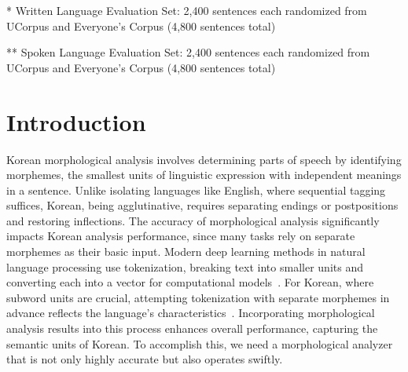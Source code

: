 \documentclass[AMS,STIX2COL]{WileyNJD-v2}
\begin{document}
\begin{table*}[ht]
\begin{tabular*}{500pt}{@{\extracolsep\fill}cccD{.}{.}{3}c@{\extracolsep\fill}}
            \bottomrule
        \end{tabular*}
        \begin{tablenotes}
            \footnotesize
            \item\hspace{2mm} * Written Language Evaluation Set: 2,400 sentences each randomized from UCorpus and Everyone's Corpus (4,800 sentences total)
            \item\hspace{2mm} ** Spoken Language Evaluation Set: 2,400 sentences each randomized from UCorpus and Everyone's Corpus (4,800 sentences total)
        \end{tablenotes}
    \end{table*}

    \section{Introduction}\label{sec:intro}

    Korean morphological analysis involves determining parts of speech by identifying morphemes, the smallest units of linguistic expression with independent meanings in a sentence.
    Unlike isolating languages like English, where sequential tagging suffices, Korean, being agglutinative, requires separating endings or postpositions and restoring inflections.
    The accuracy of morphological analysis significantly impacts Korean analysis performance, since many tasks rely on separate morphemes as their basic input.
    Modern deep learning methods in natural language processing use tokenization, breaking text into smaller units and converting each into a vector for computational models~\cite{Mikolov2013}.
    For Korean, where subword units are crucial, attempting tokenization with separate morphemes in advance reflects the language's characteristics~\cite{SongHJ2021}.
    Incorporating morphological analysis results into this process enhances overall performance, capturing the semantic units of Korean.
    To accomplish this, we need a morphological analyzer that is not only highly accurate but also operates swiftly.
\end{document}
